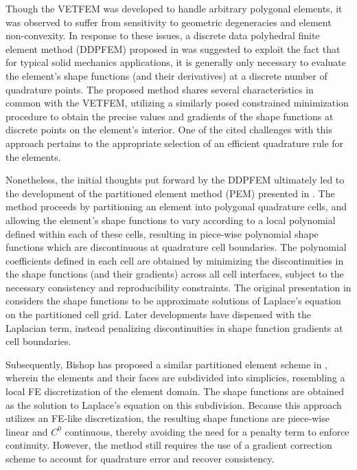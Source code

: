 		Though the VETFEM was developed to handle arbitrary polygonal elements, it was observed to suffer from sensitivity to geometric degeneracies and element non-convexity. In response to these issues, a discrete data polyhedral finite element method (DDPFEM) proposed in \cite{Selimotic:08} was suggested to exploit the fact that for typical solid mechanics applications, it is generally only necessary to evaluate the element's shape functions (and their derivatives) at a discrete number of quadrature points. The proposed method shares several characteristics in common with the VETFEM, utilizing a similarly posed constrained minimization procedure to obtain the precise values and gradients of the shape functions at discrete points on the element's interior. One of the cited challenges with this approach pertains to the appropriate selection of an efficient quadrature rule for the elements.
			
		Nonetheless, the initial thoughts put forward by the DDPFEM ultimately led to the development of the partitioned element method (PEM) presented in \cite{Rashid:12}. The method proceeds by partitioning an element into polygonal quadrature cells, and allowing the element's shape functions to vary according to a local polynomial defined within each of these cells, resulting in piece-wise polynomial shape functions which are discontinuous at quadrature cell boundaries. The polynomial coefficients defined in each cell are obtained by minimizing the discontinuities in the shape functions (and their gradients) across all cell interfaces, subject to the necessary consistency and reproducibility constraints. The original presentation in \cite{Rashid:12} considers the shape functions to be approximate solutions of Laplace's equation on the partitioned cell grid. Later developments have dispensed with the Laplacian term, instead penalizing discontinuities in shape function gradients at cell boundaries.
			
		Subsequently, Bishop has proposed a similar partitioned element scheme in \cite{Bishop:14}, wherein the elements and their faces are subdivided into simplicies, resembling a local FE discretization of the element domain. The shape functions are obtained as the solution to Laplace's equation on this subdivision. Because this approach utilizes an FE-like discretization, the resulting shape functions are piece-wise linear and $C^0$ continuous, thereby avoiding the need for a penalty term to enforce continuity. However, the method still requires the use of a gradient correction scheme to account for quadrature error and recover consistency.

